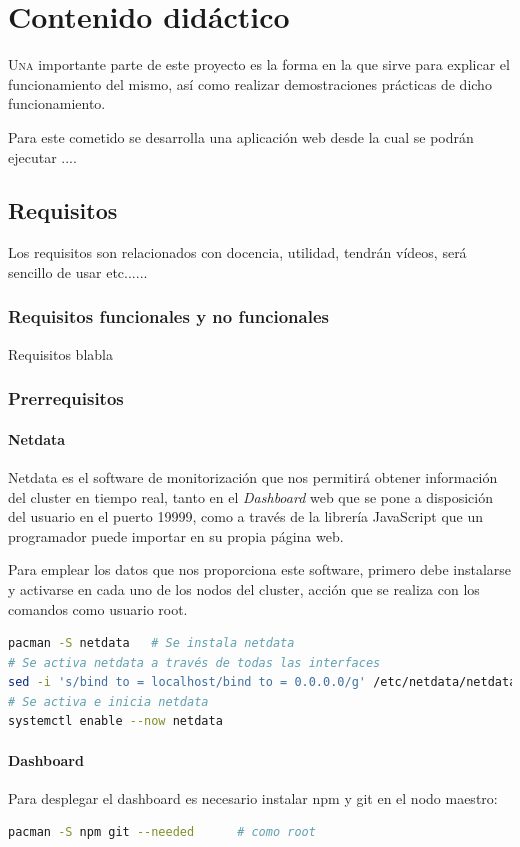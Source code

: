\chapter{Contenido didáctico}
\label{chap:contenido_didactico}

\lettrine{U}{na} importante parte de este proyecto es la forma en la que sirve para explicar el funcionamiento del mismo, así como realizar demostraciones prácticas de dicho funcionamiento.

Para este cometido se desarrolla una aplicación web desde la cual se podrán ejecutar ....

\section{Requisitos}
Los requisitos son relacionados con docencia, utilidad, tendrán vídeos, será sencillo de usar etc......

\subsection{Requisitos funcionales y no funcionales}
Requisitos blabla

\subsection{Prerrequisitos}
\subsubsection{Netdata}
Netdata es el software de monitorización que nos permitirá obtener información del cluster en tiempo real, tanto en el \textit{Dashboard} web que se pone a disposición del usuario en el puerto 19999, como a través de la librería JavaScript que un programador puede importar en su propia página web.

Para emplear los datos que nos proporciona este software, primero debe instalarse y activarse en cada uno de los nodos del cluster, acción que se realiza con los comandos como usuario root.

\begin{lstlisting}[language=bash]
pacman -S netdata   # Se instala netdata
# Se activa netdata a través de todas las interfaces
sed -i 's/bind to = localhost/bind to = 0.0.0.0/g' /etc/netdata/netdata.conf
# Se activa e inicia netdata
systemctl enable --now netdata
\end{lstlisting}

\subsubsection{Dashboard}
Para desplegar el dashboard es necesario instalar npm y git en el nodo maestro:
\begin{lstlisting}[language=bash]
pacman -S npm git --needed      # como root
\end{lstlisting}

